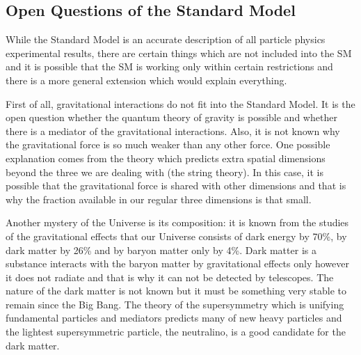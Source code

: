 \subsection{Open Questions of the Standard Model}


While the Standard Model is an accurate description of all particle physics experimental results, there are certain things which are not included into the SM and it is possible that the SM is working only within certain restrictions and there is a more general extension which would explain everything.

First of all, gravitational interactions do not fit into the Standard Model. It is the open question whether the quantum theory of gravity is possible and whether there is a mediator of the gravitational interactions. Also, it is not known why the gravitational force is so much weaker than any other force. One possible explanation comes from the theory which predicts extra spatial dimensions beyond the three we are dealing with (the string theory). In this case, it is possible that the gravitational force is shared with other dimensions and that is why the fraction available in our regular three dimensions is that small.

Another mystery of the Universe is its composition: it is known from the studies of the gravitational effects that our Universe consists of dark energy by 70\%, by dark matter by 26\% and by baryon matter only by 4\%. Dark matter is a substance interacts with the baryon matter by gravitational effects only however it does not radiate and that is why it can not be detected by telescopes. The nature of the dark matter is not known but it must be something very stable to remain since the Big Bang. 
The theory of the supersymmetry which is unifying fundamental particles and mediators predicts many of new heavy particles and the lightest supersymmetric particle, the neutralino, is a good candidate for the dark matter.

